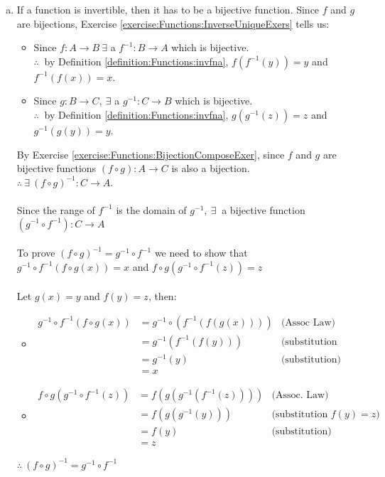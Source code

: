 \begin{enumerate}[(a)]
\item \label{InverseIdentityExers-InvOfComp}
If a function is invertible, then it has to be a bijective function. Since $f$ and $g$ are bijections, Exercise \ref{exercise:Functions:InverseUniqueExers} tells us:
	\begin{itemize}
	\item
	Since $f\colon A\to B\ \exists$ a $f^{-1}\colon B\to A$ which is bijective.\\
	$\therefore\ $ by Definition \ref{definition:Functions:invfna}, $f(f^{-1}(y)) = y$ and $f^{-1}(f(x)) = x$.
	
	\item
	Since $g\colon B\to C,\ \exists$ a $g^{-1}\colon C\to B$ which is bijective.\\
	$\therefore\ $ by Definition \ref{definition:Functions:invfna}, $g(g^{-1}(z)) = z$ and $g^{-1}(g(y)) = y$.
	\end{itemize}

By Exercise \ref{exercise:Functions:BijectionComposeExer}, since $f$ and $g$ are bijective functions $(f\circ g)\colon A\to C$ is also a bijection.\\
$\therefore\ \exists\ (f\circ g)^{-1}\colon C\to A$.\\
\\
Since the range of $f^{-1}$ is the domain of $g^{-1},\ \exists\ $ a bijective function $(g^{-1}\circ f^{-1})\colon C\to A$\\
\\
To prove $(f\circ g)^{-1} = g^{-1}\circ f^{-1}$ we need to show that $g^{-1}\circ f^{-1}(f\circ g(x)) = x$ and $f\circ g(g^{-1}\circ f^{-1}(z)) = z$\\
\\
Let $g(x) = y$ and $f(y) = z$, then:
	\begin{itemize}
	\item
	\begin{align*}
	g^{-1}\circ f^{-1}(f\circ g(x)) &= g^{-1}\circ (f^{-1}(f(g(x)))) &\text{(Assoc Law)}\\
	&= g^{-1}(f^{-1}(f(y))) &\text{(substitution g(x))}\\
	&= g^{-1}(y) &\text{(substitution)}\\
	&= x
	\end{align*}

	\item
	\begin{align*}
	f\circ g(g^{-1}\circ f^{-1}(z)) &= f(g(g^{-1}(f^{-1}(z)))) &\text{(Assoc. Law)}\\
	&= f(g(g^{-1}(y))) &\text{(substitution $f(y) = z$)}\\
	&= f(y) &\text{(substitution)}\\
	&= z
	\end{align*}
	\end{itemize}
	$\therefore\ (f\circ g)^{-1} = g^{-1}\circ f^{-1}$
	

\end{enumerate}
